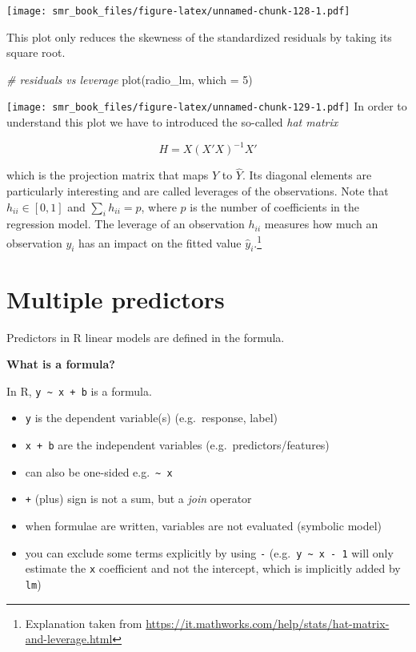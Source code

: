 \documentclass[
  oneside]{book}
\newenvironment{Shaded}{\begin{snugshade}}{\end{snugshade}}
\newcommand{\AttributeTok}[1]{\textcolor[rgb]{0.77,0.63,0.00}{#1}}
\newcommand{\CommentTok}[1]{\textcolor[rgb]{0.56,0.35,0.01}{\textit{#1}}}
\newcommand{\DecValTok}[1]{\textcolor[rgb]{0.00,0.00,0.81}{#1}}
\newcommand{\FunctionTok}[1]{\textcolor[rgb]{0.00,0.00,0.00}{#1}}
\newcommand{\NormalTok}[1]{#1}
\providecommand{\tightlist}{%
  \setlength{\itemsep}{0pt}\setlength{\parskip}{0pt}}
\begin{document}
\texttt{[image: smr\_book\_files/figure-latex/unnamed-chunk-128-1.pdf]}

This plot only reduces the skewness of the standardized
residuals by taking its square root.

\begin{Shaded}
\begin{Highlighting}[]
\CommentTok{\# residuals vs leverage}
\FunctionTok{plot}\NormalTok{(radio\_lm, }\AttributeTok{which =} \DecValTok{5}\NormalTok{)}
\end{Highlighting}
\end{Shaded}

\texttt{[image: smr\_book\_files/figure-latex/unnamed-chunk-129-1.pdf]}
In order to understand this plot we have to introduced the
so-called \emph{hat matrix}

\[
H = X (X'X)^{-1} X'
\]

which is the projection matrix that maps \(Y\) to \(\hat Y\).
Its diagonal elements are particularly interesting and are called
leverages of the observations. Note that \(h_{ii} \in [0,1]\) and
\(\sum_i h_{ii} = p\), where \(p\) is the number of coefficients in the regression model.
The leverage of an observation \(h_{ii}\) measures how much an observation \(y_i\)
has an impact on the fitted value \(\hat y_i\).\footnote{Explanation taken from
  \url{https://it.mathworks.com/help/stats/hat-matrix-and-leverage.html}}

\hypertarget{multiple-predictors}{%
\section{Multiple predictors}\label{multiple-predictors}}

Predictors in R linear models are defined in the formula.

\textbf{What is a formula?}

In R, \texttt{y\ \textasciitilde{}\ x\ +\ b} is a formula.

\begin{itemize}
\tightlist
\item
  \texttt{y} is the dependent variable(s) (e.g.~response, label)
\item
  \texttt{x\ +\ b} are the independent variables (e.g.~predictors/features)
\item
  can also be one-sided e.g.~\texttt{\textasciitilde{}\ x}
\item
  \texttt{+} (plus) sign is not a sum, but a \emph{join} operator
\item
  when formulae are written, variables are not evaluated (symbolic model)
\item
  you can exclude some terms explicitly by using \texttt{-} (e.g.~\texttt{y\ \textasciitilde{}\ x\ -\ 1}
  will only estimate the \texttt{x} coefficient and not the intercept, which
  is implicitly added by \texttt{lm})
\end{itemize}
\end{document}
